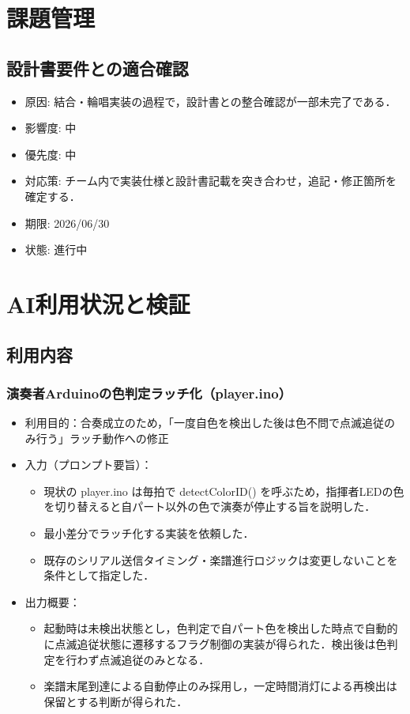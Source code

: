 \documentclass[lualatex,paper=a4paper,jafontsize=11.5pt,jafontscale=1.05]{jlreq}
\begin{document}
\section{課題管理}\label{sec:issues}

\subsection{設計書要件との適合確認}
\begin{itemize}
  \item 原因: 結合・輪唱実装の過程で，設計書との整合確認が一部未完了である．
  \item 影響度: 中
  \item 優先度: 中
  \item 対応策: チーム内で実装仕様と設計書記載を突き合わせ，追記・修正箇所を確定する．
  \item 期限: 2026/06/30
  \item 状態: 進行中
\end{itemize}

\section{AI利用状況と検証}
\subsection{利用内容}
\subsubsection{演奏者Arduinoの色判定ラッチ化（player.ino）}
\begin{itemize}
    \item 利用目的：合奏成立のため，「一度自色を検出した後は色不問で点滅追従のみ行う」ラッチ動作への修正
    \item 入力（プロンプト要旨）：
    \begin{itemize}
        \item 現状の player.ino は毎拍で detectColorID() を呼ぶため，指揮者LEDの色を切り替えると自パート以外の色で演奏が停止する旨を説明した．
        \item 最小差分でラッチ化する実装を依頼した．
        \item 既存のシリアル送信タイミング・楽譜進行ロジックは変更しないことを条件として指定した．
    \end{itemize}
    \item 出力概要：
    \begin{itemize}
        \item 起動時は未検出状態とし，色判定で自パート色を検出した時点で自動的に点滅追従状態に遷移するフラグ制御の実装が得られた．検出後は色判定を行わず点滅追従のみとなる．
        \item 楽譜末尾到達による自動停止のみ採用し，一定時間消灯による再検出は保留とする判断が得られた．
    \end{itemize}
\end{itemize}
\end{document}
